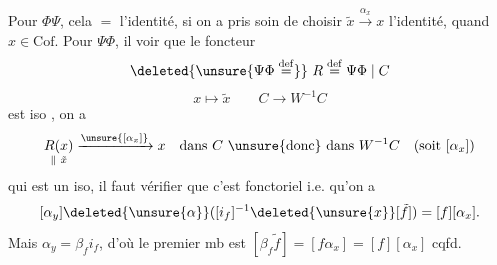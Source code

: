 Pour $\Phi\Psi$, cela $=$ l'identité, si on a pris soin de choisir $\tilde x\xrightarrow{\alpha_x}x$ l'identité, quand $x\in\mathrm{Cof}$.
Pour $\Psi\Phi$, il   voir que le foncteur
\[
\deleted{\unsure{\Psi\Phi\overset{\mathrm{def}}{=}}}\ R\overset{\mathrm{def}}{=}\Psi\Phi\mid C
\]
\[
x\longmapsto\tilde x\qquad C\longrightarrow W^{-1}C
\]
est iso  , on a
\[
\underset{\parallel\ \tilde x}{R(x)}\xrightarrow{\unsure{[\alpha_x]}}x\quad\text{dans }C\ \unsure{\text{donc}}\ \text{dans }W^{-1}C\quad(\text{soit }[\alpha_x])
\]
qui est un iso, il faut vérifier que c'est fonctoriel
i.e. qu'on a
\[
[\alpha_y]\deleted{\unsure{\alpha}}([i_f]^{-1}\deleted{\unsure{x}}[\tilde f])=[f][\alpha_x].
\]
Mais $\alpha_y=\beta_f i_f$, d'où le premier mb est $[\beta_f\tilde f]=[f\alpha_x]=[f][\alpha_x]$ cqfd.
